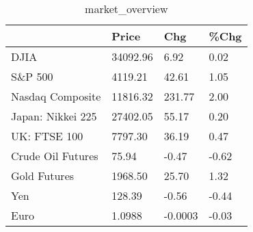 \documentclass{article}%
\begin{document}
%


\begin{table}[htbp]%
\caption{market\_overview}%
\centering%
\begin{adjustbox}{width=1\textwidth}%
\begin{tabular}{llll}
\toprule
                  &    Price &     Chg &  \%Chg \\
\midrule
             DJIA & 34092.96 &    6.92 &  0.02 \\
          S\&P 500 &  4119.21 &   42.61 &  1.05 \\
 Nasdaq Composite & 11816.32 &  231.77 &  2.00 \\
Japan: Nikkei 225 & 27402.05 &   55.17 &  0.20 \\
     UK: FTSE 100 &  7797.30 &   36.19 &  0.47 \\
Crude Oil Futures &    75.94 &   -0.47 & -0.62 \\
     Gold Futures &  1968.50 &   25.70 &  1.32 \\
              Yen &   128.39 &   -0.56 & -0.44 \\
             Euro &   1.0988 & -0.0003 & -0.03 \\
\bottomrule
\end{tabular}
%
\end{adjustbox}%
\end{table}

%
\end{document}
